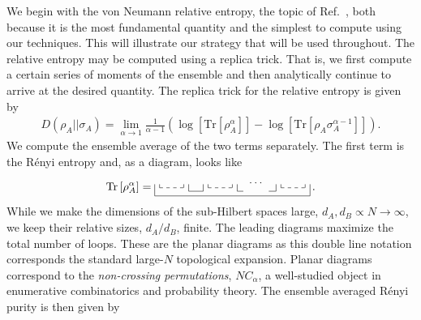 \documentclass[a4paper,11pt]{article}
\newcommand{\Tr}{\text{Tr}}
\newcommand*{\JKF}[1]{\textcolor{blue}{[JKF: #1]}}
\newcommand*{\SR}[1]{\textcolor{magenta}{[SR: \textsf{#1}]}}
\begin{document}
We begin with the von Neumann relative entropy, the topic of Ref.~\cite{2021PhRvL.126q1603K}, both because it is the most fundamental quantity and the simplest to compute using our techniques. This will illustrate our strategy that will be used throughout. The relative entropy may be computed using a replica trick. That is, we first compute a certain series of moments of the ensemble and then analytically continue to arrive at the desired quantity.
The replica trick for the relative entropy is given by
\cite{2016PhRvL.117d1601L}
\begin{align}
    D(\rho_A \lvert \rvert \sigma_A) = \lim_{\alpha \rightarrow1}\frac{1}{\alpha -1} \left(\log\left[ \Tr \left[\rho_A^\alpha \right]\right]- \log \left[\Tr\left[ \rho^{\ }_A  \sigma_A^{\alpha -1}\right]\right]\right).
    \label{S_replica}
\end{align}
We compute the ensemble average of the two terms separately. The first term is the R\'enyi entropy and, as a diagram, looks like
\begin{align}
    \label{renyi_diag}
    \Tr \left[\rho_{A}^{\alpha} \right]=
    \tikz[scale=0.75,baseline=-0.5ex]{
    \draw[dashed] (0,0) -- (1,0);
    \draw (0,0)-- (0,.15);
    \draw (1,0)-- (1,.15);
    \draw (-0.2,0.15)-- (-0.2,-0.35);
    \draw (1.2,-0.15)-- (1.2,0.15);
    \draw[dashed,black] (2,0) -- (3,0);
    \draw[black] (2,0)-- (2,0.15);
    \draw[black] (3,0)-- (3,0.15);
    \draw[black] (1.8,-.15)-- (1.8,0.15);
    \draw[black] (3.2,-0.15)-- (3.2,0.15);
    \draw[dashed,black] (5,0) -- (6,0);
    \draw[black] (5,0)-- (5,0.15);
    \draw[black] (6,0)-- (6,0.15);
    \draw[black] (4.8,0.15)-- (4.8,-0.15);
    \draw[black] (6.2,-0.35)-- (6.2,0.15);
    \draw (1.2,-0.15)--(1.8,-0.15);
    \draw[black] (3.2,-0.15)--(3.45,-0.15);
    \draw (-0.2,-0.35)-- (6.2,-0.35);
    \draw[black] (4.5,-0.15)--(4.8,-0.15);
    \node[] at (4.,0.2) {$\cdots$};
    }
    \, .
\end{align}
While we make the dimensions of the sub-Hilbert spaces large, $d_A, d_B \propto N\rightarrow \infty$, we keep their relative sizes, $d_A/d_B$, finite.
The leading diagrams maximize the total number of loops.  These are the planar diagrams as this double line notation corresponds the standard large-$N$ topological expansion. Planar diagrams correspond to the \textit{non-crossing permutations}, $NC_{\alpha}$, a well-studied object in enumerative combinatorics and probability theory. The ensemble averaged R\'enyi purity is then given by
\end{document}
